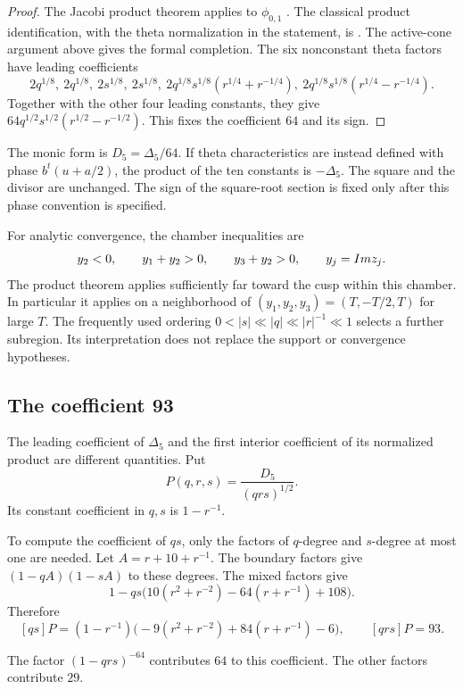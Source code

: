 \begin{proof}
The Jacobi product theorem applies to \(\phi_{0,1}\)
\cite[Theorem 2.1 and Example 2.4]{GNII}.
The classical product identification, with the theta normalization
in the statement, is \cite[Theorem 4.1]{GN}.
The active-cone argument above gives the formal completion.
The six nonconstant theta factors have leading coefficients
\[
 2q^{1/8},\ 2q^{1/8},\
 2s^{1/8},\ 2s^{1/8},\
 2q^{1/8}s^{1/8}(r^{1/4}+r^{-1/4}),\
 2q^{1/8}s^{1/8}(r^{1/4}-r^{-1/4}).
\]
Together with the other four leading constants, they give
\(64q^{1/2}s^{1/2}(r^{1/2}-r^{-1/2})\).
This fixes the coefficient \(64\) and its sign.
\end{proof}

The monic form is \(D_5=\Delta_5/64\).
If theta characteristics are instead defined with phase
\(b^t(u+a/2)\), the product of the ten constants is
\(-\Delta_5\).  The square and the divisor are unchanged.
The sign of the square-root section is fixed only after this phase
convention is specified.

For analytic convergence, the chamber inequalities are
\[
 y_2<0,\qquad y_1+y_2>0,\qquad y_3+y_2>0,
 \qquad y_j=Im z_j.
\]
The product theorem applies sufficiently far toward the cusp within
this chamber.  In particular it applies on a neighborhood of
\((y_1,y_2,y_3)=(T,-T/2,T)\) for large \(T\).
The frequently used ordering
\(0<|s|\ll|q|\ll|r|^{-1}\ll1\) selects a further subregion.
Its interpretation does not replace the support or convergence
hypotheses.

\subsection{The coefficient 93}

The leading coefficient of \(\Delta_5\) and the first interior
coefficient of its normalized product are different quantities.
Put
\[
 P(q,r,s)=\frac{D_5}{(qrs)^{1/2}}.
\]
Its constant coefficient in \(q,s\) is \(1-r^{-1}\).

To compute the coefficient of \(qs\), only the factors of
\(q\)-degree and \(s\)-degree at most one are needed.
Let \(A=r+10+r^{-1}\).  The boundary factors give
\((1-qA)(1-sA)\) to these degrees.  The mixed factors give
\[
 1-qs\bigl(10(r^2+r^{-2})-64(r+r^{-1})+108\bigr).
\]
Therefore
\[
 [qs]P=(1-r^{-1})
 \bigl(-9(r^2+r^{-2})+84(r+r^{-1})-6\bigr),
 \qquad [qrs]P=93.
\]

The factor \((1-qrs)^{-64}\) contributes \(64\) to this
coefficient.  The other factors contribute \(29\).

